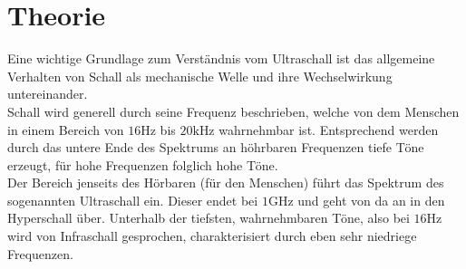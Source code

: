 \section{Theorie}
Eine wichtige Grundlage zum Verständnis vom Ultraschall ist das allgemeine Verhalten von Schall als mechanische Welle 
und ihre Wechselwirkung untereinander. \\ 
Schall wird generell durch seine Frequenz beschrieben, welche von dem Menschen in einem Bereich von $16 \si{\hertz}$ bis $20 \si{\kilo\hertz}$
wahrnehmbar ist. Entsprechend werden durch das untere Ende des Spektrums an höhrbaren Frequenzen tiefe Töne erzeugt,
für hohe Frequenzen folglich hohe Töne. \\
Der Bereich jenseits des Hörbaren (für den Menschen) führt das Spektrum des sogenannten Ultraschall ein. Dieser endet bei 
$1 \si{\giga\hertz} $ und geht von da an in den Hyperschall über. Unterhalb der tiefsten, wahrnehmbaren Töne, also bei $16 \si{\hertz}$
wird von Infraschall gesprochen, charakterisiert durch eben sehr niedriege Frequenzen.

